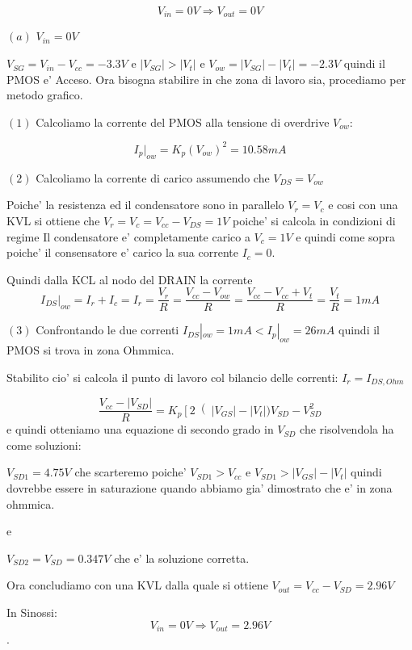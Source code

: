 \documentclass[\main/main.tex]{subfiles}
\begin{document}
\[V_{in} = 0V \Rightarrow V_{out} = 0V\]

$(a)$ $V_{in} = 0V$

$V_{SG} = V_{in} - V_{cc} = -3.3V$ e $|V_{SG}| > |V_t|$ e $V_{ow} = |V_{SG}| - |V_t| = -2.3V$ quindi il PMOS e' Acceso.
Ora bisogna stabilire in che zona di lavoro sia, procediamo per metodo grafico.

$(1)$ Calcoliamo la corrente del PMOS alla tensione di overdrive $V_{ow}$:

\[I_p |_{ow} = K_p \left(V_{ow}\right)^2 = 10.58mA\]

$(2)$ Calcoliamo la corrente di carico assumendo che $V_{DS} = V_{ow}$

Poiche' la resistenza ed il condensatore sono in parallelo $V_r = V_c$ e cosi con una KVL si ottiene che $V_r = V_c = V_{cc} - V_{DS} = 1V$ poiche' si calcola in condizioni di regime Il condensatore e' completamente carico a $V_c = 1V$  e quindi come sopra poiche' il consensatore e' carico la sua corrente $I_c = 0$.

Quindi dalla KCL al nodo del DRAIN la corrente \[I_{DS}|_{ow} = I_r + I_c = I_r = \frac{V_r}{R}= \frac{ V_{cc} - V_{ow}}{R} =  \frac{ V_{cc} - V_{cc} + V_t}{R} = \frac{V_t}{R} = 1mA\]

$(3)$ Confrontando le due correnti $I_{DS}|_{ow} = 1mA < I_p |_{ow} = 26mA$ quindi il PMOS si trova in zona Ohmmica.


Stabilito cio' si calcola il punto di lavoro col bilancio delle correnti:
$I_r = I_{DS,Ohm}$

\[\frac{V_{cc} - |V_{SD}|}{R} = K_p \left[ 2 \right(|V_{GS}| - |V_t|)V_{SD} - V_{SD}^2\]
e quindi otteniamo una equazione di secondo grado in $V_{SD}$ che risolvendola ha come soluzioni:

$V_{SD1} = 4.75V$ che scarteremo poiche' $V_{SD1} > V_{cc}$ e $V_{SD1} > |V_{GS}| - |V_t|$ quindi dovrebbe essere in saturazione quando abbiamo gia' dimostrato che e' in zona ohmmica.

e

$V_{SD2} = V_{SD} = 0.347V$ che e' la soluzione corretta.

Ora concludiamo con una KVL dalla quale si ottiene $V_{out} = V_{cc} - V_{SD} = 2.96V$

In Sinossi:
\[V_{in} = 0V \Rightarrow V_{out} = 2.96V\]
.
\end{document}
